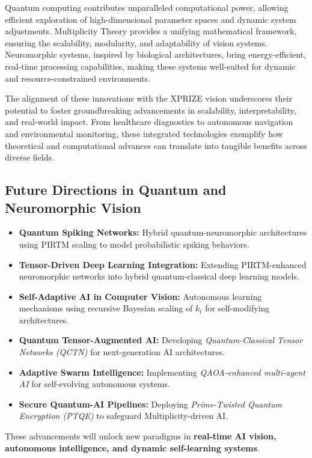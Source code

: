 \documentclass{article}
\theoremstyle{plain}
\begin{document}
Quantum computing contributes unparalleled computational power, allowing efficient exploration of high-dimensional parameter spaces and dynamic system adjustments. Multiplicity Theory provides a unifying mathematical framework, ensuring the scalability, modularity, and adaptability of vision systems. Neuromorphic systems, inspired by biological architectures, bring energy-efficient, real-time processing capabilities, making these systems well-suited for dynamic and resource-constrained environments.

The alignment of these innovations with the XPRIZE vision underscores their potential to foster groundbreaking advancements in scalability, interpretability, and real-world impact. From healthcare diagnostics to autonomous navigation and environmental monitoring, these integrated technologies exemplify how theoretical and computational advances can translate into tangible benefits across diverse fields.

\subsection{Future Directions in Quantum and Neuromorphic Vision}
\begin{itemize}
    \item \textbf{Quantum Spiking Networks:} Hybrid quantum-neuromorphic architectures using PIRTM scaling to model probabilistic spiking behaviors.
    \item \textbf{Tensor-Driven Deep Learning Integration:} Extending PIRTM-enhanced neuromorphic networks into hybrid quantum-classical deep learning models.
    \item \textbf{Self-Adaptive AI in Computer Vision:} Autonomous learning mechanisms using recursive Bayesian scaling of \( k_t \) for self-modifying architectures.
    \item \textbf{Quantum Tensor-Augmented AI:} Developing \textit{Quantum-Classical Tensor Networks (QCTN)} for next-generation AI architectures.
    \item \textbf{Adaptive Swarm Intelligence:} Implementing \textit{QAOA-enhanced multi-agent AI} for self-evolving autonomous systems.
    \item \textbf{Secure Quantum-AI Pipelines:} Deploying \textit{Prime-Twisted Quantum Encryption (PTQE)} to safeguard Multiplicity-driven AI.
\end{itemize}

These advancements will unlock new paradigms in \textbf{real-time AI vision, autonomous intelligence, and dynamic self-learning systems}.
\end{document}
